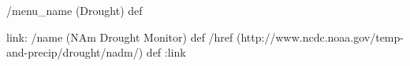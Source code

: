 \begin{ingrid}
/menu_name (Drought) def

link:
/name (NAm Drought Monitor) def
/href (http://www.ncdc.noaa.gov/temp-and-precip/drought/nadm/) def
:link

\end{ingrid}
